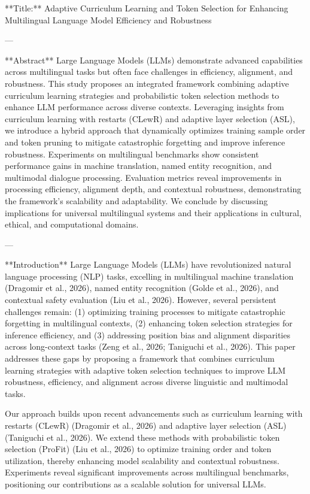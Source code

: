 **Title:** Adaptive Curriculum Learning and Token Selection for Enhancing Multilingual Language Model Efficiency and Robustness  

---

**Abstract**  
Large Language Models (LLMs) demonstrate advanced capabilities across multilingual tasks but often face challenges in efficiency, alignment, and robustness. This study proposes an integrated framework combining adaptive curriculum learning strategies and probabilistic token selection methods to enhance LLM performance across diverse contexts. Leveraging insights from curriculum learning with restarts (CLewR) and adaptive layer selection (ASL), we introduce a hybrid approach that dynamically optimizes training sample order and token pruning to mitigate catastrophic forgetting and improve inference robustness. Experiments on multilingual benchmarks show consistent performance gains in machine translation, named entity recognition, and multimodal dialogue processing. Evaluation metrics reveal improvements in processing efficiency, alignment depth, and contextual robustness, demonstrating the framework's scalability and adaptability. We conclude by discussing implications for universal multilingual systems and their applications in cultural, ethical, and computational domains.

---

**Introduction**  
Large Language Models (LLMs) have revolutionized natural language processing (NLP) tasks, excelling in multilingual machine translation (Dragomir et al., 2026), named entity recognition (Golde et al., 2026), and contextual safety evaluation (Liu et al., 2026). However, several persistent challenges remain: (1) optimizing training processes to mitigate catastrophic forgetting in multilingual contexts, (2) enhancing token selection strategies for inference efficiency, and (3) addressing position bias and alignment disparities across long-context tasks (Zeng et al., 2026; Taniguchi et al., 2026). This paper addresses these gaps by proposing a framework that combines curriculum learning strategies with adaptive token selection techniques to improve LLM robustness, efficiency, and alignment across diverse linguistic and multimodal tasks.

Our approach builds upon recent advancements such as curriculum learning with restarts (CLewR) (Dragomir et al., 2026) and adaptive layer selection (ASL) (Taniguchi et al., 2026). We extend these methods with probabilistic token selection (ProFit) (Liu et al., 2026) to optimize training order and token utilization, thereby enhancing model scalability and contextual robustness. Experiments reveal significant improvements across multilingual benchmarks, positioning our contributions as a scalable solution for universal LLMs.

